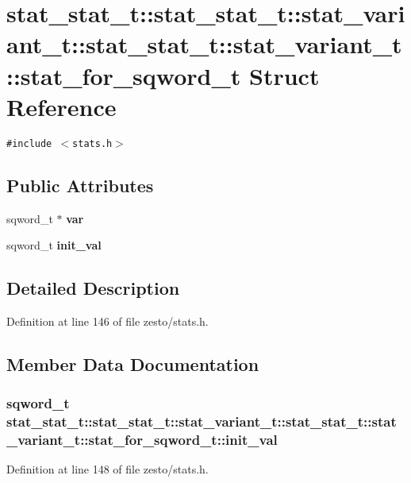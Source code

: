 \section{stat\_\-stat\_\-t::stat\_\-stat\_\-t::stat\_\-variant\_\-t::stat\_\-stat\_\-t::stat\_\-variant\_\-t::stat\_\-for\_\-sqword\_\-t Struct Reference}
\label{structstat__stat__t_1_1stat__variant__t_1_1stat__for__sqword__t}
{\tt \#include $<$stats.h$>$}

\subsection*{Public Attributes}
\begin{CompactItemize}
\item 
sqword\_\-t $\ast$ {\bf var}
\item 
sqword\_\-t {\bf init\_\-val}
\end{CompactItemize}


\subsection{Detailed Description}


Definition at line 146 of file zesto/stats.h.

\subsection{Member Data Documentation}
\subsubsection[{init\_\-val}]{\setlength{\rightskip}{0pt plus 5cm}sqword\_\-t stat\_\-stat\_\-t::stat\_\-stat\_\-t::stat\_\-variant\_\-t::stat\_\-stat\_\-t::stat\_\-variant\_\-t::stat\_\-for\_\-sqword\_\-t::init\_\-val}\label{structstat__stat__t_1_1stat__variant__t_1_1stat__for__sqword__t_d0b607ff09eeb1a73c9998892b6cee89}




Definition at line 148 of file zesto/stats.h.

